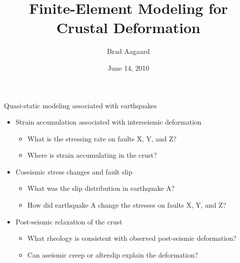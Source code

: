 \documentclass[pdftex,cig,slideColor]{pp4slides}
\title{Finite-Element Modeling for Crustal Deformation}
\subtitle{}
\author{Brad Aagaard}
\date{June 14, 2010}
\begin{document}
\maketitle
\vfill


  \vfill
  Quasi-static modeling associated with earthquakes

  \begin{itemize}
  \item Strain accumulation associated with interseismic deformation
    \begin{itemize}
    \item What is the stressing rate on faults X, Y, and Z?
    \item Where is strain accumulating in the crust?
    \end{itemize}
  \item Coseismic stress changes and fault slip
    \begin{itemize}
    \item What was the slip distribution in earthquake A?
    \item How did earthquake A change the stresses on faults X, Y, and Z?
    \end{itemize}
  \item Post-seismic relaxation of the crust
    \begin{itemize}
    \item What rheology is consistent with observed post-seismic deformation?
    \item Can aseismic creep or afterslip explain the deformation?
    \end{itemize}
  \end{itemize}
  \vfill




\end{document}
